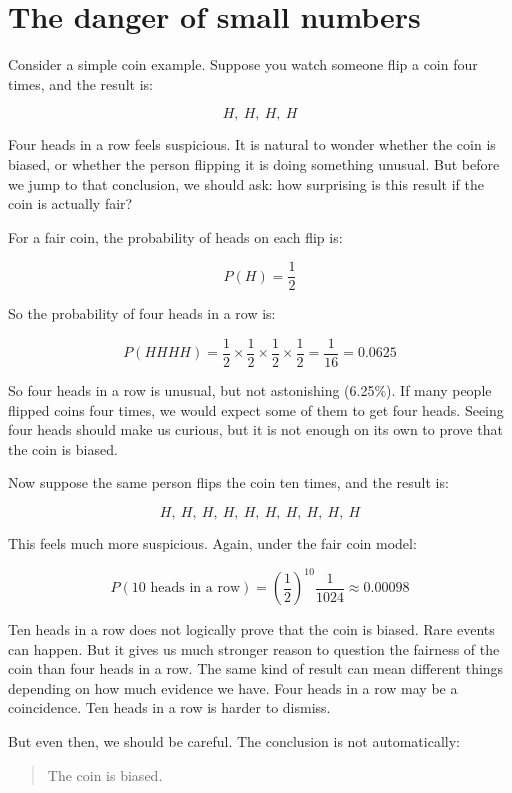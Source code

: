 \documentclass[
  letterpaper,
  DIV=11,
  numbers=noendperiod]{scrreprt}
\begin{document}
\section{The danger of small numbers}\label{the-danger-of-small-numbers}

Consider a simple coin example. Suppose you watch someone flip a coin
four times, and the result is:

\[
H,\ H,\ H,\ H
\]

Four heads in a row feels suspicious. It is natural to wonder whether
the coin is biased, or whether the person flipping it is doing something
unusual. But before we jump to that conclusion, we should ask: how
surprising is this result if the coin is actually fair?

For a fair coin, the probability of heads on each flip is:

\[
P(H) = \frac{1}{2}
\]

So the probability of four heads in a row is:

\[
P(HHHH) =
\frac{1}{2}
\times
\frac{1}{2}
\times
\frac{1}{2}
\times
\frac{1}{2}
= \frac{1}{16}
= 0.0625
\]

So four heads in a row is unusual, but not astonishing (6.25\%). If many
people flipped coins four times, we would expect some of them to get
four heads. Seeing four heads should make us curious, but it is not
enough on its own to prove that the coin is biased.

Now suppose the same person flips the coin ten times, and the result is:

\[
H,\ H,\ H,\ H,\ H,\ H,\ H,\ H,\ H,\ H
\]

This feels much more suspicious. Again, under the fair coin model:

\[
P(10 \text{ heads in a row})
= \left(\frac{1}{2}\right)^{10}
\frac{1}{1024}
\approx 0.00098
\]

Ten heads in a row does not logically prove that the coin is biased.
Rare events can happen. But it gives us much stronger reason to question
the fairness of the coin than four heads in a row. The same kind of
result can mean different things depending on how much evidence we have.
Four heads in a row may be a coincidence. Ten heads in a row is harder
to dismiss.

But even then, we should be careful. The conclusion is not
automatically:

\begin{quote}
The coin is biased.
\end{quote}
\end{document}
